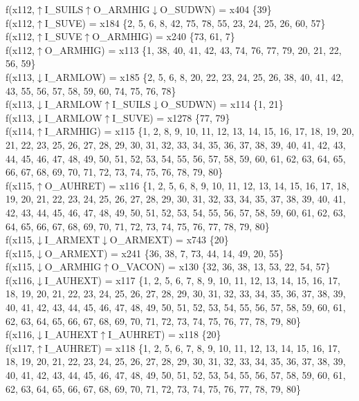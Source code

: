 f(x112,$\uparrow$I\_SUILS$\uparrow$O\_ARMHIG$\downarrow$O\_SUDWN) = x404 \{39\} \\  
f(x112,$\uparrow$I\_SUVE) = x184 \{2, 5, 6, 8, 42, 75, 78, 55, 23, 24, 25, 26, 60, 57\} \\  
f(x112,$\uparrow$I\_SUVE$\uparrow$O\_ARMHIG) = x240 \{73, 61, 7\} \\  
f(x112,$\uparrow$O\_ARMHIG) = x113 \{1, 38, 40, 41, 42, 43, 74, 76, 77, 79, 20, 21, 22, 56, 59\} \\  
f(x113,$\downarrow$I\_ARMLOW) = x185 \{2, 5, 6, 8, 20, 22, 23, 24, 25, 26, 38, 40, 41, 42, 43, 55, 56, 57, 58, 59, 60, 74, 75, 76, 78\} \\  
f(x113,$\downarrow$I\_ARMLOW$\uparrow$I\_SUILS$\downarrow$O\_SUDWN) = x114 \{1, 21\} \\  
f(x113,$\downarrow$I\_ARMLOW$\uparrow$I\_SUVE) = x1278 \{77, 79\} \\  
f(x114,$\uparrow$I\_ARMHIG) = x115 \{1, 2, 8, 9, 10, 11, 12, 13, 14, 15, 16, 17, 18, 19, 20, 21, 22, 23, 25, 26, 27, 28, 29, 30, 31, 32, 33, 34, 35, 36, 37, 38, 39, 40, 41, 42, 43, 44, 45, 46, 47, 48, 49, 50, 51, 52, 53, 54, 55, 56, 57, 58, 59, 60, 61, 62, 63, 64, 65, 66, 67, 68, 69, 70, 71, 72, 73, 74, 75, 76, 78, 79, 80\} \\  
f(x115,$\uparrow$O\_AUHRET) = x116 \{1, 2, 5, 6, 8, 9, 10, 11, 12, 13, 14, 15, 16, 17, 18, 19, 20, 21, 22, 23, 24, 25, 26, 27, 28, 29, 30, 31, 32, 33, 34, 35, 37, 38, 39, 40, 41, 42, 43, 44, 45, 46, 47, 48, 49, 50, 51, 52, 53, 54, 55, 56, 57, 58, 59, 60, 61, 62, 63, 64, 65, 66, 67, 68, 69, 70, 71, 72, 73, 74, 75, 76, 77, 78, 79, 80\} \\  
f(x115,$\downarrow$I\_ARMEXT$\downarrow$O\_ARMEXT) = x743 \{20\} \\  
f(x115,$\downarrow$O\_ARMEXT) = x241 \{36, 38, 7, 73, 44, 14, 49, 20, 55\} \\  
f(x115,$\downarrow$O\_ARMHIG$\uparrow$O\_VACON) = x130 \{32, 36, 38, 13, 53, 22, 54, 57\} \\  
f(x116,$\downarrow$I\_AUHEXT) = x117 \{1, 2, 5, 6, 7, 8, 9, 10, 11, 12, 13, 14, 15, 16, 17, 18, 19, 20, 21, 22, 23, 24, 25, 26, 27, 28, 29, 30, 31, 32, 33, 34, 35, 36, 37, 38, 39, 40, 41, 42, 43, 44, 45, 46, 47, 48, 49, 50, 51, 52, 53, 54, 55, 56, 57, 58, 59, 60, 61, 62, 63, 64, 65, 66, 67, 68, 69, 70, 71, 72, 73, 74, 75, 76, 77, 78, 79, 80\} \\  
f(x116,$\downarrow$I\_AUHEXT$\uparrow$I\_AUHRET) = x118 \{20\} \\  
f(x117,$\uparrow$I\_AUHRET) = x118 \{1, 2, 5, 6, 7, 8, 9, 10, 11, 12, 13, 14, 15, 16, 17, 18, 19, 20, 21, 22, 23, 24, 25, 26, 27, 28, 29, 30, 31, 32, 33, 34, 35, 36, 37, 38, 39, 40, 41, 42, 43, 44, 45, 46, 47, 48, 49, 50, 51, 52, 53, 54, 55, 56, 57, 58, 59, 60, 61, 62, 63, 64, 65, 66, 67, 68, 69, 70, 71, 72, 73, 74, 75, 76, 77, 78, 79, 80\} \\  
